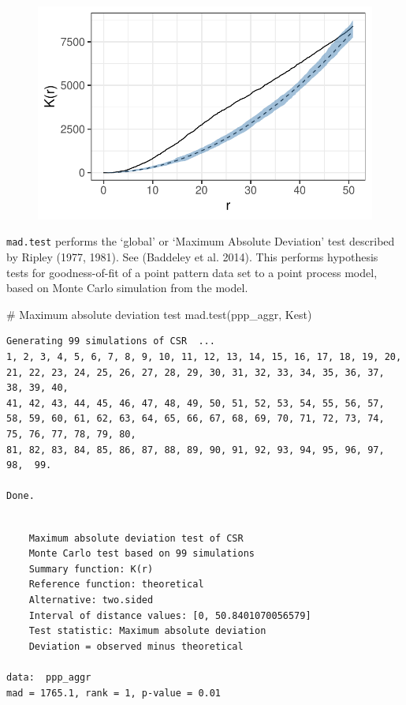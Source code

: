 \documentclass[
  letterpaper,
  DIV=11,
  numbers=noendperiod]{scrreprt}
\newenvironment{Shaded}{\begin{snugshade}}{\end{snugshade}}
\newcommand{\CommentTok}[1]{\textcolor[rgb]{0.37,0.37,0.37}{#1}}
\newcommand{\FunctionTok}[1]{\textcolor[rgb]{0.28,0.35,0.67}{#1}}
\newcommand{\NormalTok}[1]{\textcolor[rgb]{0.00,0.23,0.31}{#1}}
\begin{document}
\begin{figure}[H]

{\centering \includegraphics{spatial-tests_files/figure-pdf/unnamed-chunk-38-1.pdf}

}

\end{figure}

\texttt{mad.test} performs the `global' or `Maximum Absolute Deviation'
test described by Ripley (1977, 1981). See (Baddeley et al. 2014). This
performs hypothesis tests for goodness-of-fit of a point pattern data
set to a point process model, based on Monte Carlo simulation from the
model.

\begin{Shaded}
\begin{Highlighting}[]
\CommentTok{\# Maximum absolute deviation test}
\FunctionTok{mad.test}\NormalTok{(ppp\_aggr, Kest)}
\end{Highlighting}
\end{Shaded}

\begin{verbatim}
Generating 99 simulations of CSR  ...
1, 2, 3, 4, 5, 6, 7, 8, 9, 10, 11, 12, 13, 14, 15, 16, 17, 18, 19, 20, 21, 22, 23, 24, 25, 26, 27, 28, 29, 30, 31, 32, 33, 34, 35, 36, 37, 38, 39, 40,
41, 42, 43, 44, 45, 46, 47, 48, 49, 50, 51, 52, 53, 54, 55, 56, 57, 58, 59, 60, 61, 62, 63, 64, 65, 66, 67, 68, 69, 70, 71, 72, 73, 74, 75, 76, 77, 78, 79, 80,
81, 82, 83, 84, 85, 86, 87, 88, 89, 90, 91, 92, 93, 94, 95, 96, 97, 98,  99.

Done.
\end{verbatim}

\begin{verbatim}

    Maximum absolute deviation test of CSR
    Monte Carlo test based on 99 simulations
    Summary function: K(r)
    Reference function: theoretical
    Alternative: two.sided
    Interval of distance values: [0, 50.8401070056579]
    Test statistic: Maximum absolute deviation
    Deviation = observed minus theoretical

data:  ppp_aggr
mad = 1765.1, rank = 1, p-value = 0.01
\end{verbatim}
\end{document}
